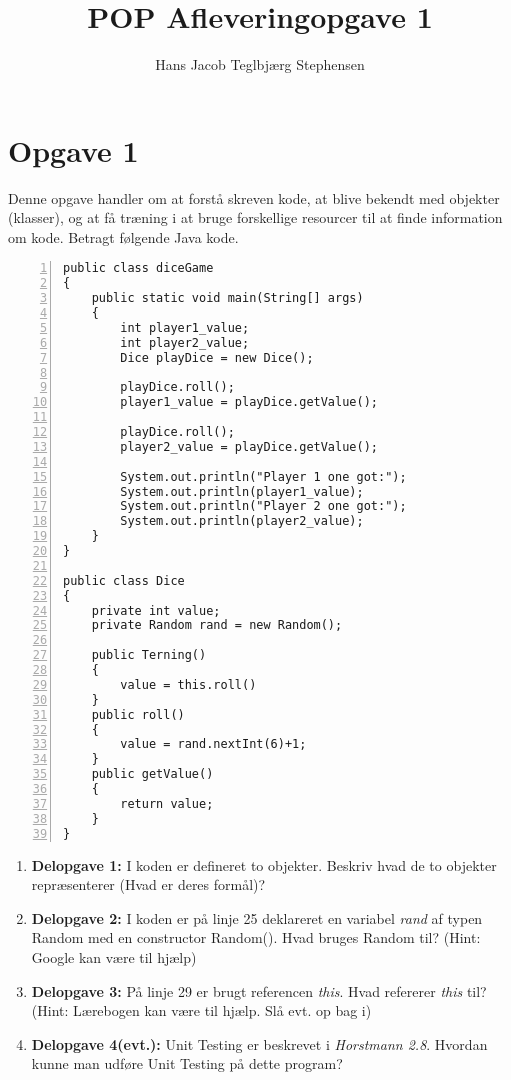 \documentclass[a4paper]{article}
\author{Hans Jacob Teglbjærg Stephensen}
\begin{document}
\title{POP Afleveringopgave 1}

\maketitle

\section{Opgave 1}
Denne opgave handler om at forstå skreven kode, at blive bekendt med objekter (klasser), og at få træning i at bruge forskellige resourcer til at finde information om kode. Betragt følgende Java kode.

\begin{Verbatim}[numbers=left,numbersep=5pt]
public class diceGame
{
    public static void main(String[] args)
    {
        int player1_value;
        int player2_value;
        Dice playDice = new Dice();
        
        playDice.roll();
        player1_value = playDice.getValue();
        
        playDice.roll();
        player2_value = playDice.getValue();
        
        System.out.println("Player 1 one got:");        
        System.out.println(player1_value);
        System.out.println("Player 2 one got:");        
        System.out.println(player2_value);
    }
}

public class Dice
{
    private int value;
    private Random rand = new Random();  
    
    public Terning()
    {
        value = this.roll()
    }
    public roll()
    {
        value = rand.nextInt(6)+1;
    }
    public getValue()
    {
        return value;
    }
}
\end{Verbatim}

\begin{enumerate}
\item \textbf{Delopgave 1:} I koden er defineret to objekter. Beskriv hvad de to objekter repræsenterer (Hvad er deres formål)?
\item \textbf{Delopgave 2:} I koden er på linje 25 deklareret en variabel \textit{rand} af typen Random med en constructor Random(). Hvad bruges Random til? (Hint: Google kan være til hjælp)
\item \textbf{Delopgave 3:} På linje 29 er brugt referencen \textit{this}. Hvad refererer \textit{this} til? (Hint: Lærebogen kan være til hjælp. Slå evt. op bag i)
\item \textbf{Delopgave 4(evt.):} Unit Testing er beskrevet i \textit{Horstmann 2.8}. Hvordan kunne man udføre Unit Testing på dette program?
\end{enumerate}
\end{document}
